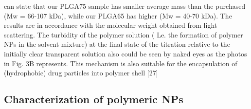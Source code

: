 \documentclass[11pt,letterpaper]{article}
\begin{document}
	can state that our PLGA75 sample has smaller average mass than the
	purchased (Mw = 66-107 kDa), while our PLGA65 has higher
	(Mw = 40-70 kDa). The results are in accordance with the molecular
	weight obtained from light scattering.
	The turbidity of the polymer solution ( Le. the formation of polymer
	NPs in the solvent mixture) at the final state of the titration relative to
	the initially clear transparent solution also could be seen by naked eyes
	as the photos in Fig. 3B represents. This mechanism is also suitable for
	the encapsulation of (hydrophobic) drug particles into polymer shell
	[27]
	
	\subsection{Characterization of polymeric NPs}
	
\end{document}
